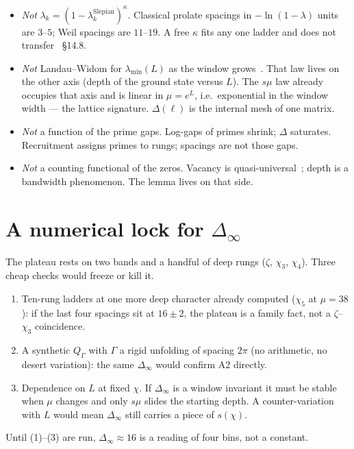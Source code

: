 \documentclass[10pt]{article}
\theoremstyle{definition}
\begin{document}
\begin{itemize}
\item \emph{Not} $\lambda_k=(1-\lambda_k^{\mathrm{Slepian}})^\kappa$.
Classical prolate spacings in $-\ln(1-\lambda)$ units are $3$--$5$;
Weil spacings are $11$--$19$. A free $\kappa$ fits any one ladder and
does not transfer~\cite{LabNB} \S14.8.
\item \emph{Not} Landau--Widom for $\lambda_{\min}(L)$ as the window
grows~\cite{Chuk}. That law lives on the other axis (depth of the
ground state versus $L$). The $s\mu$ law already occupies that axis
and is linear in $\mu=e^L$, i.e.\ exponential in the window width ---
the lattice signature. $\Delta(\ell)$ is the internal mesh of one
matrix.
\item \emph{Not} a function of the prime gaps. Log-gaps of primes
shrink; $\Delta$ saturates. Recruitment assigns primes to rungs;
spacings are not those gaps.
\item \emph{Not} a counting functional of the zeros. Vacancy is
quasi-universal~\cite{Depth}; depth is a bandwidth phenomenon. The
lemma lives on that side.
\end{itemize}

\section{A numerical lock for $\Delta_\infty$}

The plateau rests on two bands and a handful of deep rungs ($\zeta$,
$\chi_3$, $\chi_4$). Three cheap checks would freeze or kill it.

\begin{enumerate}
\item Ten-rung ladders at one more deep character already computed
($\chi_5$ at $\mu=38$): if the last four spacings sit at $16\pm2$,
the plateau is a family fact, not a $\zeta$--$\chi_3$ coincidence.
\item A synthetic $Q_\Gamma$ with $\Gamma$ a rigid unfolding of
spacing $2\pi$ (no arithmetic, no desert variation): the same
$\Delta_\infty$ would confirm A2 directly.
\item Dependence on $L$ at fixed $\chi$. If $\Delta_\infty$ is a
window invariant it must be stable when $\mu$ changes and only
$s\mu$ slides the starting depth. A counter-variation with $L$
would mean $\Delta_\infty$ still carries a piece of $s(\chi)$.
\end{enumerate}

Until (1)--(3) are run, $\Delta_\infty\approx16$ is a reading of four
bins, not a constant.
\end{document}
